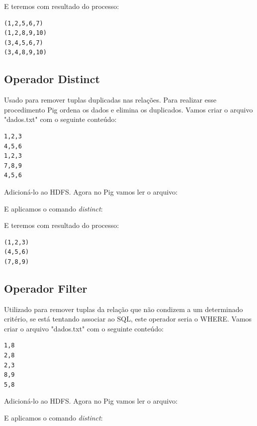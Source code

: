 \documentclass[a4paper,11pt]{article}
\begin{document}
E teremos com resultado do processo:
\begin{lstlisting}[]
(1,2,5,6,7)
(1,2,8,9,10)
(3,4,5,6,7)
(3,4,8,9,10)
\end{lstlisting}

\subsection{Operador Distinct}
Usado para remover tuplas duplicadas nas relações. Para realizar esse procedimento Pig ordena os dados e elimina os duplicados. Vamos criar o arquivo "dados.txt" com o seguinte conteúdo:
\begin{lstlisting}[]
1,2,3
4,5,6
1,2,3
7,8,9
4,5,6
\end{lstlisting}

Adicioná-lo ao HDFS. Agora no Pig vamos ler o arquivo: \\

E aplicamos o comando \textit{distinct}: \\

E teremos com resultado do processo:
\begin{lstlisting}[]
(1,2,3)
(4,5,6)
(7,8,9)
\end{lstlisting}

\subsection{Operador Filter}
Utilizado para remover tuplas da relação que não condizem a um determinado critério, se está tentando associar ao SQL, este operador seria o WHERE. Vamos criar o arquivo "dados.txt" com o seguinte conteúdo:
\begin{lstlisting}[]
1,8
2,8
2,3
8,9
5,8
\end{lstlisting}

Adicioná-lo ao HDFS. Agora no Pig vamos ler o arquivo: \\

E aplicamos o comando \textit{distinct}: \\
\end{document}
